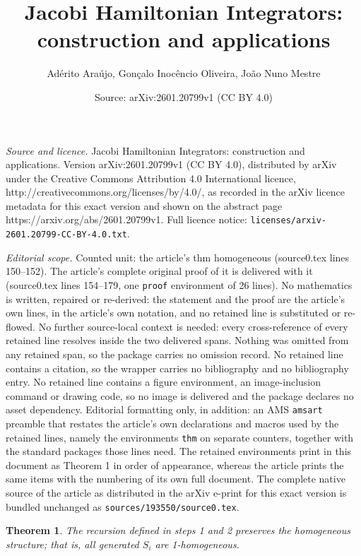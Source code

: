 \documentclass[10pt,a4paper]{amsart}
\title{Jacobi Hamiltonian Integrators: construction and applications}
\author{Ad\'erito Ara\'ujo, Gon\c{c}alo Inoc\^encio Oliveira, Jo\~ao Nuno Mestre}
\date{Source: arXiv:2601.20799v1 (CC BY 4.0)}
\newtheorem{thm}{Theorem}
\begin{document}
\maketitle

\noindent\emph{Source and licence.} Jacobi Hamiltonian Integrators: construction and applications. Version arXiv:2601.20799v1 (CC BY 4.0), distributed by arXiv under the Creative Commons Attribution 4.0 International licence, http://creativecommons.org/licenses/by/4.0/, as recorded in the arXiv licence metadata for this exact version and shown on the abstract page https://arxiv.org/abs/2601.20799v1. Full licence notice: \texttt{licenses/arxiv-2601.20799-CC-BY-4.0.txt}.\par\smallskip

\noindent\textit{Editorial scope.} Counted unit: the article's thm homogeneous (source0.tex lines 150--152). The article's complete original proof of it is delivered with it (source0.tex lines 154--179, one \texttt{proof} environment of 26 lines). No mathematics is written, repaired or re-derived: the statement and the proof are the article's own lines, in the article's own notation, and no retained line is substituted or re-flowed.  No further source-local context is needed: every cross-reference of every retained line resolves inside the two delivered spans.  Nothing was omitted from any retained span, so the package carries no omission record.  No retained line contains a citation, so the wrapper carries no bibliography and no bibliography entry.  No retained line contains a figure environment, an image-inclusion command or drawing code, so no image is delivered and the package declares no asset dependency.  Editorial formatting only, in addition: an AMS \texttt{amsart} preamble that restates the article's own declarations and macros used by the retained lines, namely the environments \texttt{thm} on separate counters, together with the standard packages those lines need.  The retained environments print in this document as Theorem 1 in order of appearance, whereas the article prints the same items with the numbering of its own full document.  The complete native source of the article as distributed in the arXiv e-print for this exact version is bundled unchanged as \texttt{sources/193550/source0.tex}.
\begin{thm}\label{thm: S_i homogeneous}
The recursion defined in steps 1 and 2 preserves the homogeneous structure; that is, all generated $S_i$ are 1-homogeneous.
\end{thm}
\end{document}
